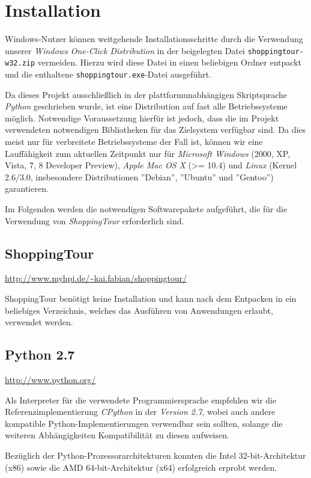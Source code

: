 ﻿\section{Installation}
Windows-Nutzer können weitgehende Installationsschritte durch die Verwendung unserer \emph{Windows One-Click Distribution} in der beigelegten Datei \texttt{shoppingtour-w32.zip} vermeiden. Hierzu wird diese Datei in einen beliebigen Ordner entpackt und die enthaltene \texttt{shoppingtour.exe}-Datei ausgeführt.

Da dieses Projekt ausschließlich in der plattformunabhängigen Skriptsprache \emph{Python} geschrieben wurde, ist eine Distribution auf fast alle Betriebssysteme möglich. Notwendige Voraussetzung hierfür ist jedoch, dass die im Projekt verwendeten notwendigen Bibliotheken für das Zielsystem verfügbar sind. Da dies meist nur für verbreitete Betriebssysteme der Fall ist, können wir eine Lauffähigkeit zum aktuellen Zeitpunkt nur für \emph{Microsoft Windows} (2000, XP, Vista, 7, 8 Developer Preview), \emph{Apple Mac OS X} (>= 10.4) und \emph{Linux} (Kernel 2.6/3.0, insbesondere Distributionen ''Debian'', ''Ubuntu'' und ''Gentoo'') garantieren.

Im Folgenden werden die notwendigen Softwarepakete aufgeführt, die für die Verwendung von \emph{ShoppingTour} erforderlich sind.

\subsection{ShoppingTour}
\url{http://www.myhpi.de/~kai.fabian/shoppingtour/}

ShoppingTour benötigt keine Installation und kann nach dem Entpacken in ein beliebiges Verzeichnis, welches das Ausführen von Anwendungen erlaubt, verwendet werden.

\subsection{Python 2.7}
\url{http://www.python.org/}

Als Interpreter für die verwendete Programmiersprache empfehlen wir die Referenzimplementierung \emph{CPython} in der \emph{Version 2.7}, wobei auch andere kompatible Python-Implementierungen verwendbar sein sollten, solange die weiteren Abhängigkeiten Kompatibilität zu diesen aufweisen.

Bezüglich der Python-Prozessorarchitekturen konnten die Intel 32-bit-Architektur (x86) sowie die AMD 64-bit-Architektur (x64) erfolgreich erprobt werden.

